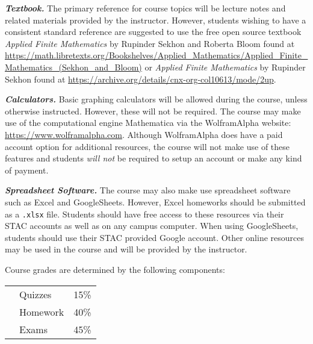 \documentclass[11pt,letterpaper]{article}
\begin{document}
\sectionbreak



{\itshape\bfseries\color{stacred}Textbook.} The primary reference for course topics will be lecture notes and related materials provided by the instructor. However, students wishing to have a consistent standard reference are suggested to use the free open source textbook \textit{Applied Finite Mathematics} by Rupinder Sekhon and Roberta Bloom found at \url{https://math.libretexts.org/Bookshelves/Applied_Mathematics/Applied_Finite_Mathematics_(Sekhon_and_Bloom)} or \textit{Applied Finite Mathematics} by Rupinder Sekhon found at \url{https://archive.org/details/cnx-org-col10613/mode/2up}. \pspace

{\itshape\bfseries\color{stacred}Calculators.} Basic graphing calculators will be allowed during the course, unless otherwise instructed. However, these will not be required. The course may make use of the computational engine Mathematica via the WolframAlpha website: \url{https://www.wolframalpha.com}. Although WolframAlpha does have a paid account option for additional resources, the course will not make use of these features and students {\itshape will not} be required to setup an account or make any kind of payment. \pspace

{\itshape\bfseries\color{stacred}Spreadsheet Software.} 
The course may also make use spreadsheet software such as Excel and GoogleSheets. However, Excel homeworks should be submitted as a \texttt{.xlsx} file. Students should have free access to these resources via their STAC accounts as well as on any campus computer. When using GoogleSheets, students should use their STAC provided Google account. Other online resources may be used in the course and will be provided by the instructor. 
\sectionbreak






 \pspace



Course grades are determined by the following components: \par
	\begin{table}[!ht]
        \begin{tabular}{clr}
	& Quizzes & 15\% \\
	& Homework & 40\% \\
	& Exams & 45\%
        \end{tabular} 
        \end{table}
\sectionbreak
\end{document}
